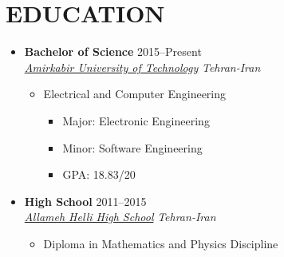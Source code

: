\section{EDUCATION}
\begin{itemize}
	\item \textbf{Bachelor of Science} \hfill 2015--Present \\
	\href{http://aut.ac.ir/aut/}{ \emph{Amirkabir University of Technology}} \hfill \emph{Tehran-Iran}
	\begin{itemize}
		\item Electrical and Computer Engineering
		\begin{itemize}		
		\item Major: Electronic Engineering \hspace{10 pt}  
		\item Minor: Software Engineering \hspace{10 pt}  
		\item GPA: 18.83/20
		\end{itemize}
	\end{itemize}
\end{itemize}

\vspace{+1 em}
\begin{itemize}
	\item \textbf{High School} \hfill 2011--2015 \\
	\href{https://www.linkedin.com/school/hellischool/}{ \emph{Allameh Helli High School}} \hfill \emph{Tehran-Iran}

	\begin{itemize}
		\item Diploma in Mathematics and Physics Discipline
	\end{itemize}

\end{itemize}

